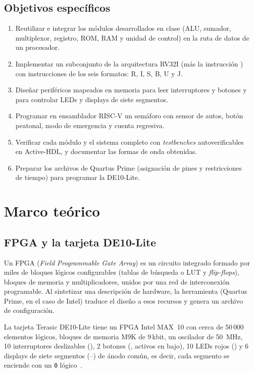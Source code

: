 \documentclass[12pt,letterpaper]{article}
\begin{document}
\subsection{Objetivos específicos}
\begin{enumerate}[itemsep=0pt]
  \item Reutilizar e integrar los módulos desarrollados en clase (ALU, sumador, multiplexor,
        registro, ROM, RAM y unidad de control) en la ruta de datos de un procesador.
  \item Implementar un subconjunto de la arquitectura RV32I (más la instrucción ) con
        instrucciones de los seis formatos: R, I, S, B, U y J.
  \item Diseñar periféricos mapeados en memoria para leer interruptores y botones y para
        controlar LEDs y displays de siete segmentos.
  \item Programar en ensamblador RISC-V un semáforo con sensor de autos, botón peatonal, modo de
        emergencia y cuenta regresiva.
  \item Verificar cada módulo y el sistema completo con \emph{testbenches} autoverificables en
        Active-HDL, y documentar las formas de onda obtenidas.
  \item Preparar los archivos de Quartus Prime (asignación de pines y restricciones de tiempo)
        para programar la DE10-Lite.
\end{enumerate}

\section{Marco teórico}\label{sec:marco}

\subsection{FPGA y la tarjeta DE10-Lite}
Un FPGA (\emph{Field Programmable Gate Array}) es un circuito integrado formado por miles de
bloques lógicos configurables (tablas de búsqueda o LUT y \emph{flip-flops}), bloques de memoria
y multiplicadores, unidos por una red de interconexión programable. Al sintetizar una
descripción de hardware, la herramienta (Quartus Prime, en el caso de Intel) traduce el diseño a
esos recursos y genera un archivo de configuración.

La tarjeta Terasic DE10-Lite tiene un FPGA Intel MAX~10  con cerca de
50\,000 elementos lógicos, bloques de memoria M9K de 9\,kbit, un oscilador de 50~MHz, 10
interruptores deslizables (), 2 botones (, activos en bajo), 10 LEDs rojos
() y 6 displays de siete segmentos (--) de ánodo común, es decir,
cada segmento se enciende con un \texttt{0} lógico~\cite{de10lite,max10}.
\end{document}
